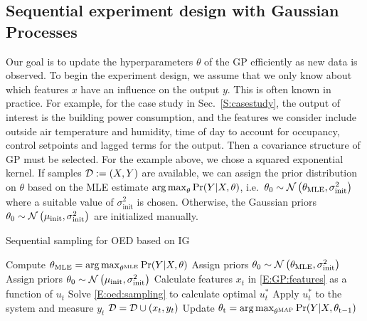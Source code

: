 \subsection{Sequential experiment design with Gaussian Processes}
\label{SS:oed:sequential}

Our goal is to update the hyperparameters \(\theta\) of the GP efficiently as new data is observed. 
To begin the experiment design, we assume that we only know about which features \(x\) have an influence on the output \(y\). This is often known in practice. For example, for the case study in Sec.~\ref{S:casestudy}, the output of interest is the building power consumption, and the features we consider include outside air temperature and humidity, time of day to account for occupancy, control setpoints and lagged terms for the output. Then a covariance structure of GP must be selected. For the example above, we chose a squared exponential kernel.
If samples \(\mathcal{D} := (X,Y)\) are available, we can assign the prior distribution on \(\theta\) based on the MLE estimate \( \operatorname*{arg\,max}_\theta \Pr(Y \vert X, \theta)\), i.e.~\(\theta_{\mathrm{0}} \sim \operatorname*{\mathcal{N}}\left(\theta_{\mathrm{MLE}}, \sigma^2_{\mathrm{init}}\right)\) where a suitable value of \(\sigma^2_{\mathrm{init}}\) is chosen.
Otherwise, the Gaussian priors \(\theta_{\mathrm{0}} \sim \operatorname*{\mathcal{N}}\left(\mu_{\mathrm{{init}}}, \sigma^2_\mathrm{init}\right)\) are initialized manually.

\begin{algorithm}[!tb]
	\caption{Sequential sampling for OED based on IG}
	\label{A:oed:sequential}
	\begin{algorithmic}[1]
		\State Compute \( \theta_{\mathrm{MLE}} = \operatorname*{arg\,max}_{\theta^{\mathrm{MLE}}} \Pr(Y \vert X, \theta)\)
		\State Assign priors \(\theta_{\mathrm{0}} \sim \operatorname*{\mathcal{N}}\left(\theta_{\mathrm{MLE}}, \sigma^2_{\mathrm{init}}\right)\)
		\Else 
		\State Assign priors \(\theta_{\mathrm{0}} \sim \operatorname*{\mathcal{N}}\left(\mu_{\mathrm{{init}}}, \sigma^2_\mathrm{init}\right)\)
		\EndIf
		\EndProcedure
		\State Calculate features \(x_t\) in \eqref{E:GP:features} as a function of \(u_t\)
		\State Solve \eqref{E:oed:sampling} to calculate optimal \(u^*_t\)
		\State Apply \(u^*_t\) to the system and measure \(y_t\)
		\State \(\mathcal{D} = \mathcal{D} \cup (x_t,y_t) \)
		\State Update \( \theta_{\mathrm{t}} = \operatorname*{arg\,max}_{\theta^{\mathrm{MAP}}} \Pr(Y \vert X, \theta_{\mathrm{t-1}})\)
		\EndWhile
		\EndProcedure
	\end{algorithmic}
\end{algorithm}

